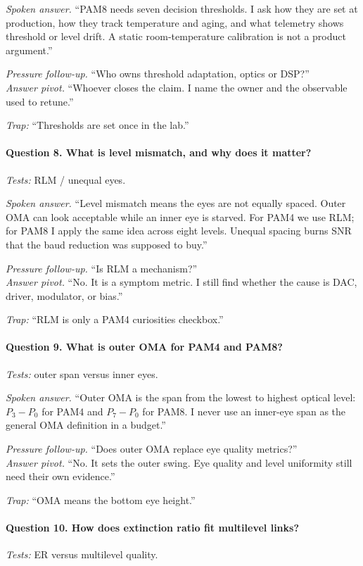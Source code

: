 \textit{Spoken answer.}
``PAM8 needs seven decision thresholds. I ask how they are set at production,
how they track temperature and aging, and what telemetry shows threshold or
level drift. A static room-temperature calibration is not a product argument.''

\textit{Pressure follow-up.} ``Who owns threshold adaptation, optics or DSP?''\\
\textit{Answer pivot.} ``Whoever closes the claim. I name the owner and the
observable used to retune.''

\textit{Trap:} ``Thresholds are set once in the lab.''

\paragraph{Question 8. What is level mismatch, and why does it matter?}
\textit{Tests:} RLM / unequal eyes.

\textit{Spoken answer.}
``Level mismatch means the eyes are not equally spaced. Outer OMA can look
acceptable while an inner eye is starved. For PAM4 we use RLM; for PAM8 I apply
the same idea across eight levels. Unequal spacing burns SNR that the baud
reduction was supposed to buy.''

\textit{Pressure follow-up.} ``Is RLM a mechanism?''\\
\textit{Answer pivot.} ``No. It is a symptom metric. I still find whether the
cause is DAC, driver, modulator, or bias.''

\textit{Trap:} ``RLM is only a PAM4 curiosities checkbox.''

\paragraph{Question 9. What is outer OMA for PAM4 and PAM8?}
\textit{Tests:} outer span versus inner eyes.

\textit{Spoken answer.}
``Outer OMA is the span from the lowest to highest optical level: \(P_3-P_0\)
for PAM4 and \(P_7-P_0\) for PAM8. I never use an inner-eye span as the general
OMA definition in a budget.''

\textit{Pressure follow-up.} ``Does outer OMA replace eye quality metrics?''\\
\textit{Answer pivot.} ``No. It sets the outer swing. Eye quality and level
uniformity still need their own evidence.''

\textit{Trap:} ``OMA means the bottom eye height.''

\paragraph{Question 10. How does extinction ratio fit multilevel links?}
\textit{Tests:} ER versus multilevel quality.

